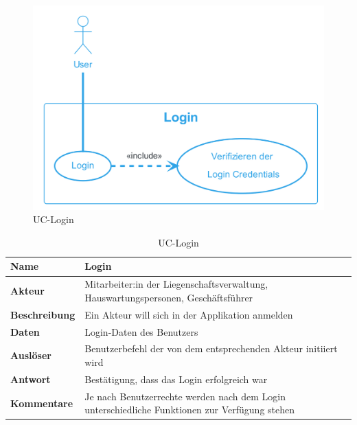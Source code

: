 
\begin{figure}[H]
  \begin{center}
    \includegraphics[width=0.6\linewidth]{content/diagrams/out/usecase/login/Login.png}
    \caption{UC-Login}
    \label{login}
  \end{center}
\end{figure}

\begin{table}[H]
  \centering
  \settowidth{}
  \setlength\extrarowheight{2pt}
  \begin{tabulary}{1.0\textwidth}{|a|m{14cm}|}
    \hline
    \textbf{Name}& Login\\
    \hline
    \textbf{Akteur}& Mitarbeiter:in der Liegenschaftsverwaltung, Hauswartungspersonen, Geschäftsführer\\
    \hline 
    \textbf{Beschreibung} & Ein Akteur will sich in der Applikation anmelden\\
    \hline
    \textbf{Daten} & Login-Daten des Benutzers\\
    \hline
    \textbf{Auslöser} & Benutzerbefehl der von dem entsprechenden Akteur initiiert wird\\
    \hline
    \textbf{Antwort} & Bestätigung, dass das Login erfolgreich war\\
    \hline
    \textbf{Kommentare} & Je nach Benutzerrechte werden nach dem Login unterschiedliche Funktionen zur Verfügung stehen\\
    \hline
  \end{tabulary}
  \caption{UC-Login}
\end{table}

